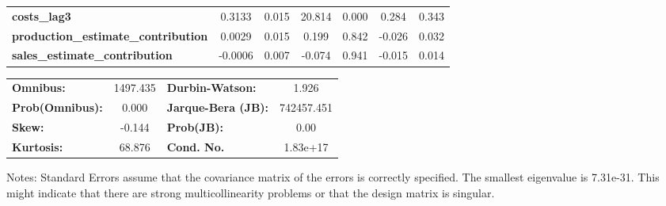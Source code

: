 \begin{center}
\begin{tabular}{lcccccc}
\textbf{costs\_lag3}                        &       0.3133  &        0.015     &    20.814  &         0.000        &        0.284    &        0.343     \\
\textbf{production\_estimate\_contribution} &       0.0029  &        0.015     &     0.199  &         0.842        &       -0.026    &        0.032     \\
\textbf{sales\_estimate\_contribution}      &      -0.0006  &        0.007     &    -0.074  &         0.941        &       -0.015    &        0.014     \\
\bottomrule
\end{tabular}
\begin{tabular}{lclc}
\textbf{Omnibus:}       & 1497.435 & \textbf{  Durbin-Watson:     } &     1.926   \\
\textbf{Prob(Omnibus):} &   0.000  & \textbf{  Jarque-Bera (JB):  } & 742457.451  \\
\textbf{Skew:}          &  -0.144  & \textbf{  Prob(JB):          } &      0.00   \\
\textbf{Kurtosis:}      &  68.876  & \textbf{  Cond. No.          } &  1.83e+17   \\
\bottomrule
\end{tabular}
\end{center}

Notes: \newline
 [1] Standard Errors assume that the covariance matrix of the errors is correctly specified. \newline
 [2] The smallest eigenvalue is 7.31e-31. This might indicate that there are \newline
 strong multicollinearity problems or that the design matrix is singular.